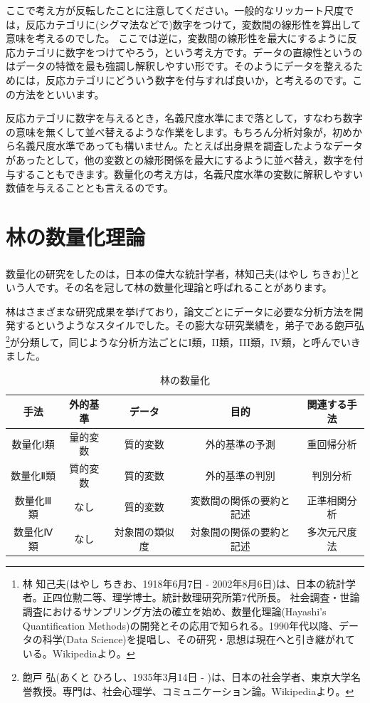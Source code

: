 \documentclass{ltjsbook}
\begin{document}
ここで考え方が反転したことに注意してください。一般的なリッカート尺度では，反応カテゴリに(シグマ法などで)数字をつけて，変数間の線形性を算出して意味を考えるのでした。
ここでは逆に，変数間の線形性を最大にするように反応カテゴリに数字をつけてやろう，という考え方です。データの直線性というのはデータの特徴を最も強調し解釈しやすい形です。そのようにデータを整えるためには，反応カテゴリにどういう数字を付与すれば良いか，と考えるのです。この方法をといいます。

反応カテゴリに数字を与えるとき，名義尺度水準にまで落として，すなわち数字の意味を無くして並べ替えるような作業をします。もちろん分析対象が，初めから名義尺度水準であっても構いません。たとえば出身県を調査したようなデータがあったとして，他の変数との線形関係を最大にするように並べ替え，数字を付与することもできます。数量化の考え方は，名義尺度水準の変数に解釈しやすい数値を与えることとも言えるのです。

\section{林の数量化理論}
数量化の研究をしたのは，日本の偉大な統計学者，林知己夫(はやし ちきお)\footnote{林 知己夫(はやし ちきお、1918年6月7日 - 2002年8月6日)は、日本の統計学者。正四位勲二等、理学博士。統計数理研究所第7代所長。 社会調査・世論調査におけるサンプリング方法の確立を始め、数量化理論(Hayashi's Quantification Methods)の開発とその応用で知られる。1990年代以降、データの科学(Data Science)を提唱し、その研究・思想は現在へと引き継がれている。Wikipediaより。}という人です。その名を冠して林の数量化理論と呼ばれることがあります。

林はさまざまな研究成果を挙げており，論文ごとにデータに必要な分析方法を開発するというようなスタイルでした。その膨大な研究業績を，弟子である飽戸弘\footnote{飽戸 弘(あくと ひろし、1935年3月14日 - )は、日本の社会学者、東京大学名誉教授。専門は、社会心理学、コミュニケーション論。Wikipediaより。}が分類して，同じような分析方法ごとにI類，II類，III類，IV類，と呼んでいきました。

\begin{table}[ht]
	\caption{林の数量化}
	\begin{tabular}{c|c|c|c|c}
		手法    & 外的基準 & データ     & 目的           & 関連する手法 \\
		\hline
		数量化Ⅰ類 & 量的変数 & 質的変数    & 外的基準の予測      & 重回帰分析  \\
		数量化Ⅱ類 & 質的変数 & 質的変数    & 外的基準の判別      & 判別分析   \\
		数量化Ⅲ類 & なし   & 質的変数    & 変数間の関係の要約と記述 & 正準相関分析 \\
		数量化Ⅳ類 & なし   & 対象間の類似度 & 対象間の関係の要約と記述 & 多次元尺度法 \\
	\end{tabular}
	\label{tbl::14_03}
\end{table}
\end{document}
